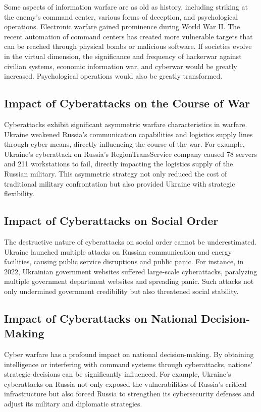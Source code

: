 \documentclass[12pt, a4paper]{article}
\begin{document}
Some aspects of information warfare are as old as history, including striking at the enemy's command center, various forms of deception, and psychological operations. Electronic warfare gained prominence during World War II. The recent automation of command centers has created more vulnerable targets that can be reached through physical bombs or malicious software. If societies evolve in the virtual dimension, the significance and frequency of hackerwar against civilian systems, economic information war, and cyberwar would be greatly increased. Psychological operations would also be greatly transformed.

\subsection{Impact of Cyberattacks on the Course of War}

Cyberattacks exhibit significant asymmetric warfare characteristics in warfare. Ukraine weakened Russia's communication capabilities and logistics supply lines through cyber means, directly influencing the course of the war. For example, Ukraine's cyberattack on Russia's RegionTransService company caused 78 servers and 211 workstations to fail, directly impacting the logistics supply of the Russian military. This asymmetric strategy not only reduced the cost of traditional military confrontation but also provided Ukraine with strategic flexibility.

\subsection{Impact of Cyberattacks on Social Order}
The destructive nature of cyberattacks on social order cannot be underestimated. Ukraine launched multiple attacks on Russian communication and energy facilities, causing public service disruptions and public panic. For instance, in 2022, Ukrainian government websites suffered large-scale cyberattacks, paralyzing multiple government department websites and spreading panic. Such attacks not only undermined government credibility but also threatened social stability.

\subsection{Impact of Cyberattacks on National Decision-Making}
Cyber warfare has a profound impact on national decision-making. By obtaining intelligence or interfering with command systems through cyberattacks, nations' strategic decisions can be significantly influenced. For example, Ukraine's cyberattacks on Russia not only exposed the vulnerabilities of Russia's critical infrastructure but also forced Russia to strengthen its cybersecurity defenses and adjust its military and diplomatic strategies.
\end{document}
